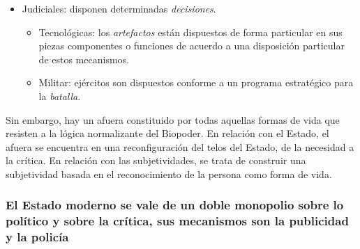 \documentclass[
]{article}
\providecommand{\tightlist}{%
  \setlength{\itemsep}{0pt}\setlength{\parskip}{0pt}}
\begin{document}
\begin{itemize}
\tightlist
\item
  Judiciales: disponen determinadas \emph{decisiones}.

  \begin{itemize}
  \tightlist
  \item
    Tecnológicas: los \emph{artefactos} están dispuestos de forma
    particular en sus piezas componentes o funciones de acuerdo a una
    disposición particular de estos mecanismos.
  \item
    Militar: ejércitos son dispuestos conforme a un programa estratégico
    para la \emph{batalla}.
  \end{itemize}
\end{itemize}

Sin embargo, hay un afuera constituido por todas aquellas formas de vida
que resisten a la lógica normalizante del Biopoder. En relación con el
Estado, el afuera se encuentra en una reconfiguración del telos del
Estado, de la necesidad a la crítica. En relación con las
subjetividades, se trata de construir una subjetividad basada en el
reconocimiento de la persona como forma de vida.

\hypertarget{el-estado-moderno-se-vale-de-un-doble-monopolio-sobre-lo-poluxedtico-y-sobre-la-cruxedtica-sus-mecanismos-son-la-publicidad-y-la-policuxeda}{%
\subsubsection{El Estado moderno se vale de un doble monopolio sobre lo
político y sobre la crítica, sus mecanismos son la publicidad y la
policía}\label{el-estado-moderno-se-vale-de-un-doble-monopolio-sobre-lo-poluxedtico-y-sobre-la-cruxedtica-sus-mecanismos-son-la-publicidad-y-la-policuxeda}}
\end{document}
